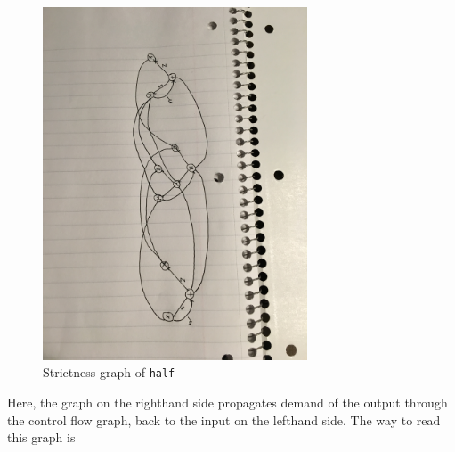 \documentclass{article}
\begin{document}
\begin{figure}[H]
  \centering
  \includegraphics[width=0.7\textwidth]{half}
  \caption{Strictness graph of \texttt{half}}
\end{figure}

Here, the graph on the righthand side propagates demand of the output
through the control flow graph, back to the input on the lefthand
side. The way to read this graph is
\end{document}
